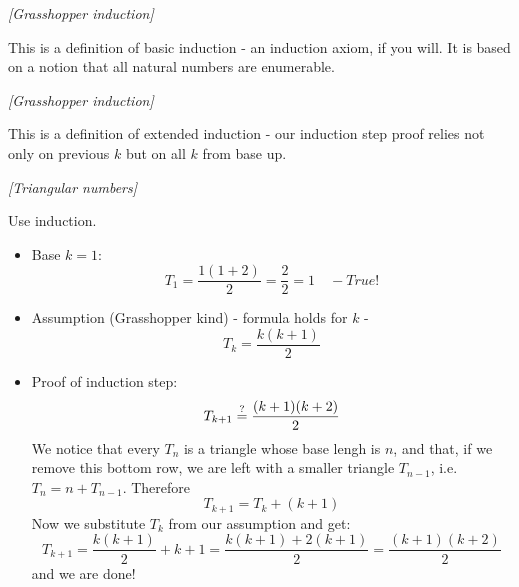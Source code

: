 
%
%


\noindent 


\begin{problem}
\textit{[Grasshopper induction]}

This is a definition of basic induction - an induction axiom, if you will. It is based on a notion that all natural numbers are enumerable. 
\end{problem}

\begin{problem}
\textit{[Grasshopper induction]}

This is a definition of extended induction - our induction step proof relies not only on previous $k$ but on all $k$ from base up.
\end{problem}

\begin{problem}
\textit{[Triangular numbers]}

Use induction. 
\begin{itemize}
\item Base $k=1$: 
$$
T_1=\frac{1(1+2)}{2}=\frac{2}{2}=1 \quad - True!
$$

\item Assumption (Grasshopper kind) - formula holds for $k$ -
$$
T_k=\frac{k(k+1)}{2}
$$

\item Proof of induction step:
$$
T_{k+1} \stackrel{?}{=} \frac{(k+1)(k+2)}{2}
$$
We notice that every ${T_{n}}$ is a triangle whose base lengh is $n$, and that, if we remove this bottom row, we are left with a smaller triangle $T_{n-1}$, i.e. $T_n=n+T_{n-1}$. Therefore
$$
T_{k+1}=T_k + (k+1)
$$
Now we substitute $T_k$ from our assumption and get:
$$
T_{k+1}=\frac{k(k+1)}{2}+k+1 = \frac{k(k+1)+2(k+1)}{2} = \frac{(k+1)(k+2)}{2}
$$
and we are done!
\end{itemize}
\end{problem}

